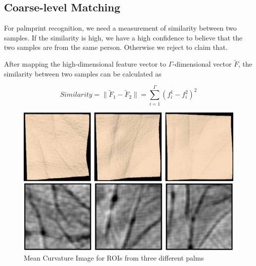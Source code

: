 \subsection{Coarse-level Matching}
\label{ssec:methodology:naive}

For palmprint recognition, we need a measurement of similarity between two samples. If the similarity is high, we have a high confidence to believe that the two samples are from the same person. Otherwise we reject to claim that.

After mapping the high-dimensional feature vector to $\Gamma$-dimensional vector $\tilde{F}$, the similarity between two samples can be calculated as

\begin{equation}
Similarity= \| \tilde{F}_1 -\tilde{F}_2 \|
= \sum \limits_{i=1}^{\Gamma} (f_i^1-f_i^2)^2
\label{eq:methodology:similarity}
\end{equation}

\begin{figure}[htb]
\begin{center}
\includegraphics[width=0.9\linewidth]{ch-methodology/figures/mci1}
\caption[MCI for ROIs from different palms]{Mean Curvature Image for ROIs from three different palms}    \label{fig:methodology:mci1}
\end{center}
\end{figure}

